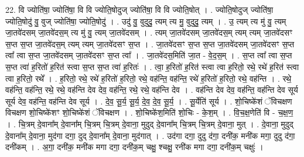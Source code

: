 \documentclass[17pt]{extarticle}
\begin{document}
22. वि ज्योति॑षा॒ ज्योति॑षा॒ वि वि ज्योति॒षोदुज् ज्योति॑षा॒ वि वि ज्योति॒षोत् । . ज्योति॒षोदुज् ज्योति॑षा॒ ज्योति॒षोदु॑ वु॒ वुज् ज्योति॑षा॒ ज्योति॒षोदु॑ । . उदु॑ वु॒ वुदुदु॒ त्यम् त्य मु॒ वुदुदु॒ त्यम् । . उ॒ त्यम् त्य मु॑ वु॒ त्यम् जा॒तवे॑दसम् जा॒तवे॑दस॒म् त्य मु॑ वु॒ त्यम् जा॒तवे॑दसम् । . त्यम् जा॒तवे॑दसम् जा॒तवे॑दस॒म् त्यम् त्यम् जा॒तवे॑दसꣳ स॒प्त स॒प्त जा॒तवे॑दस॒म् त्यम् त्यम् जा॒तवे॑दसꣳ स॒प्त । . जा॒तवे॑दसꣳ स॒प्त स॒प्त जा॒तवे॑दसम् जा॒तवे॑दसꣳ स॒प्त त्वा᳚ त्वा स॒प्त जा॒तवे॑दसम् जा॒तवे॑दसꣳ स॒प्त त्वा᳚ । . जा॒तवे॑दस॒मिति॑ जा॒त - वे॒द॒स॒म् । . स॒प्त त्वा᳚ त्वा स॒प्त स॒प्त त्वा॑ ह॒रितो॑ ह॒रित॑ स्त्वा स॒प्त स॒प्त त्वा॑ ह॒रितः॑ । . त्वा॒ ह॒रितो॑ ह॒रित॑ स्त्वा त्वा ह॒रितो॒ रथे॒ रथे॑ ह॒रित॑ स्त्वा त्वा ह॒रितो॒ रथे᳚ । . ह॒रितो॒ रथे॒ रथे॑ ह॒रितो॑ ह॒रितो॒ रथे॒ वह॑न्ति॒ वह॑न्ति॒ रथे॑ ह॒रितो॑ ह॒रितो॒ रथे॒ वह॑न्ति । . रथे॒ वह॑न्ति॒ वह॑न्ति॒ रथे॒ रथे॒ वह॑न्ति देव देव॒ वह॑न्ति॒ रथे॒ रथे॒ वह॑न्ति देव । . वह॑न्ति देव देव॒ वह॑न्ति॒ वह॑न्ति देव सूर्य सूर्य देव॒ वह॑न्ति॒ वह॑न्ति देव सूर्य । . दे॒व॒ सू॒र्य॒ सू॒र्य॒ दे॒व॒ दे॒व॒ सू॒र्य॒ । . सू॒र्येति॑ सूर्य । . शो॒चिष्के॑शं ॅविचक्षण विचक्षण शो॒चिष्के॑शꣳ शो॒चिष्के॑शं ॅविचक्षण । . शो॒चिष्के॑श॒मिति॑ शो॒चिः - के॒श॒म् । . वि॒च॒क्ष॒णेति॑ वि - च॒क्ष॒ण॒ । . चि॒त्रम् दे॒वाना᳚म् दे॒वाना᳚म् चि॒त्रम् चि॒त्रम् दे॒वाना॒ मुदुद् दे॒वाना᳚म् चि॒त्रम् चि॒त्रम् दे॒वाना॒ मुत् । . दे॒वाना॒ मुदुद् दे॒वाना᳚म् दे॒वाना॒ मुद॑गा दगा॒ दुद् दे॒वाना᳚म् दे॒वाना॒ मुद॑गात् । . उद॑गा दगा॒ दुदु द॑गा॒ दनी॑क॒ मनी॑क मगा॒ दुदु द॑गा॒ दनी॑कम् । . अ॒गा॒ दनी॑क॒ मनी॑क मगा दगा॒ दनी॑क॒म् चक्षु॒ श्चक्षु॒ रनी॑क मगा दगा॒ दनी॑क॒म् चक्षुः॑ । \newline
\end{document}
